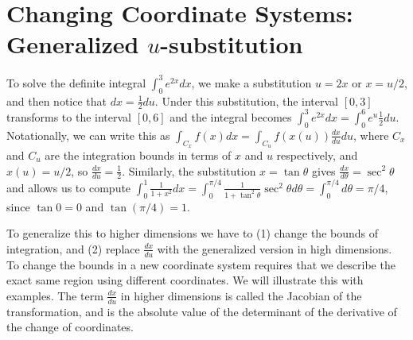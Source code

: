 \section{Changing Coordinate Systems: Generalized $u$-substitution}

To solve the definite integral $\int_0^3 e^{2x}dx$, we make a
substitution $u=2x$ or $x=u/2$, and then notice that $dx =
\frac{1}{2}du$.  Under this substitution, the interval $[0,3]$
transforms to the interval $[0,6]$ and the integral becomes $ \int_0^3
e^{2x}dx = \int_0^6 e^u\frac{1}{2}du$. Notationally, we can write this as
$\int_{C_x} f(x)dx = \int_{C_u} f(x(u))\frac{dx}{du}du$, where $C_x$ and
$C_u$ are the integration bounds in terms of $x$ and $u$ respectively,
and $x(u)=u/2$, so $\frac{dx}{du} = \frac{1}{2}$. Similarly, the
substitution $x=\tan \theta$ gives $\frac{dx}{d\theta}=\sec^2\theta$ and allows us to
compute $\int_0^1\frac{1}{1+x^2}dx =
\int_{0}^{\pi/4}\frac{1}{1+\tan^2\theta}\sec^2\theta d\theta = \int_0^{\pi/4}d\theta = \pi/4$, since
$\tan 0=0$ and $\tan (\pi/4) =1$.

To generalize this to higher dimensions we have to (1) change the
bounds of integration, and (2) replace $\frac{dx}{du}$ with the
generalized version in high dimensions.
To change the bounds in a new coordinate system requires that we
describe the exact same region using different coordinates.  We will
illustrate this with examples.  The term $\frac{dx}{du}$ in higher
dimensions is called the Jacobian of the transformation, and is the
absolute value of the determinant of the derivative of the change of
coordinates. 

